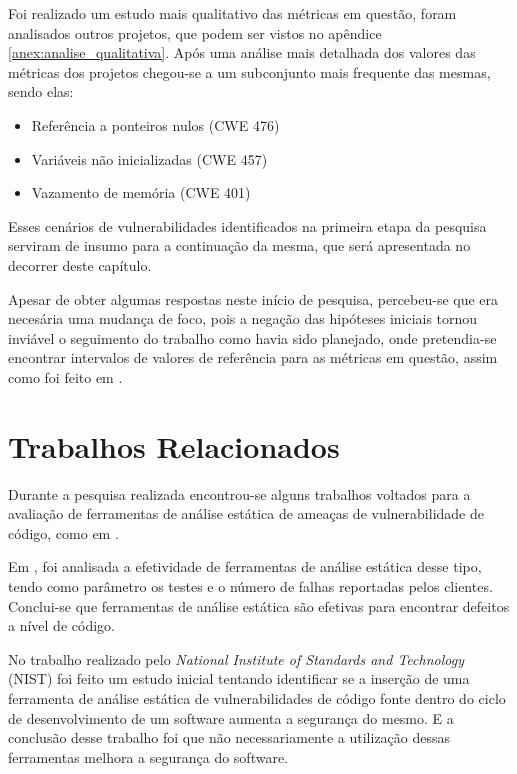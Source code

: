 Foi realizado um estudo mais qualitativo das métricas em questão, foram
analisados outros projetos, que podem ser vistos no apêndice
\ref{anex:analise_qualitativa}. Após uma análise mais detalhada dos valores
das métricas dos projetos chegou-se a um subconjunto mais frequente das mesmas,
sendo elas:

\begin{itemize}\label{principais_vuln}
  \item Referência a ponteiros nulos (CWE 476)
  \item Variáveis não inicializadas (CWE 457)
  \item Vazamento de memória (CWE 401)
\end{itemize}

Esses cenários de vulnerabilidades identificados na primeira etapa da pesquisa
serviram de insumo para a continuação da mesma, que será apresentada no decorrer
deste capítulo.

Apesar de obter algumas respostas neste início de pesquisa, percebeu-se que era
necesária uma mudança de foco, pois a negação das hipóteses iniciais tornou
inviável o seguimento do trabalho como havia sido planejado, onde pretendia-se
encontrar intervalos de valores de referência para as métricas em questão, assim
como foi feito em .




\section{Trabalhos Relacionados}\label{metodologia:trabalhosrelacionados}

Durante a pesquisa realizada encontrou-se alguns trabalhos voltados para a
avaliação de ferramentas de análise estática de ameaças de vulnerabilidade de
código, como em .

Em , foi analisada a efetividade de ferramentas
de análise estática desse tipo, tendo como parâmetro os testes e o número de
falhas reportadas pelos clientes. Conclui-se que ferramentas de análise estática
são efetivas para encontrar defeitos a nível de código.

No trabalho realizado pelo \textit{National Institute of Standards and
Technology} (NIST) \cite{nist_effect_static_analysis:2007} foi feito um estudo
inicial tentando identificar se a inserção de uma ferramenta de análise estática
de vulnerabilidades de código fonte dentro do ciclo de desenvolvimento de um
software aumenta a segurança do mesmo. E a conclusão desse trabalho foi que não
necessariamente a utilização dessas ferramentas melhora a segurança do software.

